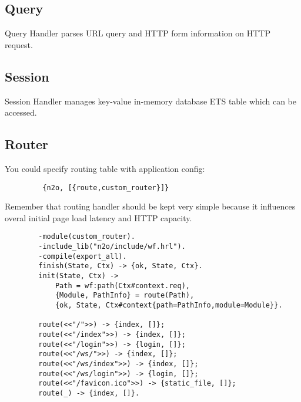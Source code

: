 \subsection{Query}
Query Handler parses URL query and HTTP form information on HTTP request.

\subsection{Session}
Session Handler manages key-value in-memory database ETS table which can be accessed.

\newpage
\subsection{Router}
You could specify routing table with application config:

\vspace{1\baselineskip}
\begin{lstlisting}
         {n2o, [{route,custom_router}]}
\end{lstlisting}
\vspace{1\baselineskip}

Remember that routing handler should be kept very simple because it
influences overal initial page load latency and HTTP capacity.

\vspace{1\baselineskip}
\begin{lstlisting}
        -module(custom_router).
        -include_lib("n2o/include/wf.hrl").
        -compile(export_all).
        finish(State, Ctx) -> {ok, State, Ctx}.
        init(State, Ctx) -> 
            Path = wf:path(Ctx#context.req),
            {Module, PathInfo} = route(Path),
            {ok, State, Ctx#context{path=PathInfo,module=Module}}.

        route(<<"/">>) -> {index, []};
        route(<<"/index">>) -> {index, []};
        route(<<"/login">>) -> {login, []};
        route(<<"/ws/">>) -> {index, []};
        route(<<"/ws/index">>) -> {index, []};
        route(<<"/ws/login">>) -> {login, []};
        route(<<"/favicon.ico">>) -> {static_file, []};
        route(_) -> {index, []}.
\end{lstlisting}
